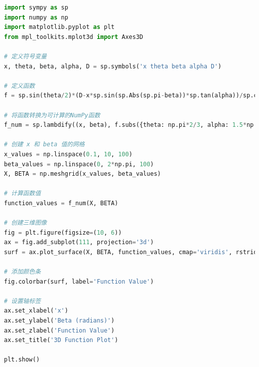\documentclass[withoutpreface,bwprint]{cumcmthesis} %
\begin{document}
\begin{appendices}
\begin{lstlisting}[language=Python]
import sympy as sp
import numpy as np
import matplotlib.pyplot as plt
from mpl_toolkits.mplot3d import Axes3D

# 定义符号变量
x, theta, beta, alpha, D = sp.symbols('x theta beta alpha D')

# 定义函数
f = sp.sin(theta/2)*(D-x*sp.sin(sp.Abs(sp.pi-beta))*sp.tan(alpha))/sp.cos(alpha-theta/2) + sp.sin(theta/2)*(D-x*sp.sin(sp.Abs(sp.pi-beta))*sp.tan(alpha))/sp.cos(alpha+theta/2)

# 将函数转换为可计算的NumPy函数
f_num = sp.lambdify((x, beta), f.subs({theta: np.pi*2/3, alpha: 1.5*np.pi/3, D: 110}), 'numpy')

# 创建 x 和 beta 值的网格
x_values = np.linspace(0.1, 10, 100)
beta_values = np.linspace(0, 2*np.pi, 100)
X, BETA = np.meshgrid(x_values, beta_values)

# 计算函数值
function_values = f_num(X, BETA)

# 创建三维图像
fig = plt.figure(figsize=(10, 6))
ax = fig.add_subplot(111, projection='3d')
surf = ax.plot_surface(X, BETA, function_values, cmap='viridis', rstride=1, cstride=1, alpha=0.8, linewidth=0)

# 添加颜色条
fig.colorbar(surf, label='Function Value')

# 设置轴标签
ax.set_xlabel('x')
ax.set_ylabel('Beta (radians)')
ax.set_zlabel('Function Value')
ax.set_title('3D Function Plot')

plt.show()


        \end{lstlisting} 
    \end{appendices}
\end{document}
